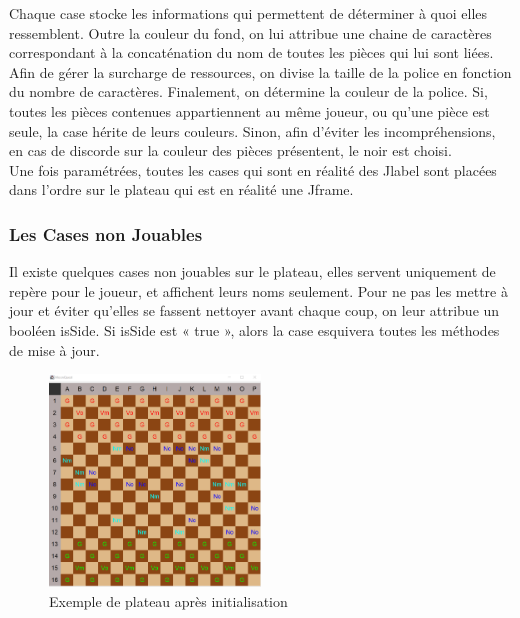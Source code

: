 \documentclass[titlepage]{report}
\begin{document}
Chaque case stocke les informations qui permettent de déterminer à quoi elles ressemblent. Outre la couleur du fond, on lui attribue une chaine de caractères correspondant à la concaténation du nom de toutes les pièces qui lui sont liées. Afin de gérer la surcharge de ressources, on divise la taille de la police en fonction du nombre de caractères. Finalement, on détermine la couleur de la police. Si, toutes les pièces contenues appartiennent au même joueur, ou qu’une pièce est seule, la case hérite de leurs couleurs. Sinon, afin d’éviter les incompréhensions, en cas de discorde sur la couleur des pièces présentent, le noir est choisi. \\

Une fois paramétrées, toutes les cases qui sont en réalité des Jlabel sont placées dans l’ordre sur le plateau qui est en réalité une Jframe. 
\subsubsection{Les Cases non Jouables}
Il existe quelques cases non jouables sur le plateau, elles servent uniquement de repère pour le joueur, et affichent leurs noms seulement. Pour ne pas les mettre à jour et éviter qu’elles se fassent nettoyer avant chaque coup, on leur attribue un booléen isSide. Si isSide est « true », alors la case esquivera toutes les méthodes de mise à jour.   
\begin{figure}[h]
    \centering
    \includegraphics[width=0.5\textwidth]{img/plateau.PNG}
    \caption{Exemple de plateau après initialisation}
\end{figure}
\end{document}
